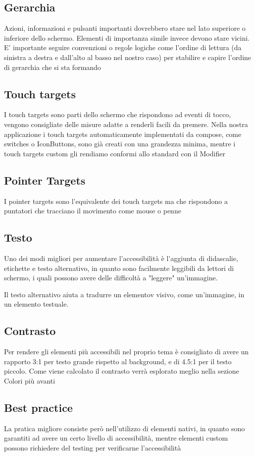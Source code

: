 \documentclass[12pt, a4paper]{report}
\begin{document}
		\subsection{Gerarchia}
			Azioni, informazioni e pulsanti importanti dovrebbero stare nel lato superiore o inferiore dello schermo.
			Elementi di importanza simile invece devono stare vicini. E' importante seguire convenzioni o regole logiche come l'ordine di lettura (da sinistra a destra e dall'alto al basso nel nostro caso) per stabilire e capire l'ordine di gerarchia che si sta formando
		\subsection{Touch targets}
			I touch targets sono parti dello schermo che rispondono ad eventi di tocco, vengono consigliate delle misure adatte a renderli facili da premere. Nella nostra applicazione i touch targets automaticamente implementati da compose, come switches o IconButtons, sono già creati con una grandezza minima,
			mentre i touch targets custom gli rendiamo conformi allo standard con il Modifier
		\subsection{Pointer Targets}
			I pointer targets sono l'equivalente dei touch targets ma che rispondono a puntatori che tracciano il movimento come mouse o penne
		\subsection{Testo}
			Uno dei modi migliori per aumentare l'accessibilità è l'aggiunta di didascalie, etichette e testo alternativo, in quanto sono facilmente leggibili da lettori di schermo, i quali possono avere delle difficoltà a "leggere" un'immagine.
			
			Il testo alternativo aiuta a tradurre un elementov visivo, come un'immagine, in un elemento testuale.
		\subsection{Contrasto}
			Per rendere gli elementi più accessibili nel proprio tema è consigliato di avere un rapporto 3:1 per testo grande rispetto al background, e di 4.5:1 per il testo piccolo. Come viene calcolato il contrasto verrà esplorato meglio nella sezione Colori più avanti

		\subsection{Best practice}
			La pratica migliore consiste però nell'utilizzo di elementi nativi, in quanto sono garantiti ad avere un certo livello di accessibilità, mentre elementi custom possono richiedere del testing per verificarne l'accessibilità
\end{document}

